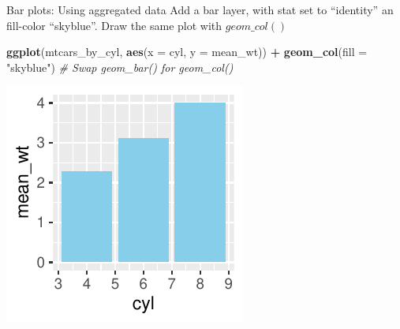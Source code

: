 \documentclass[
  ignorenonframetext,
]{beamer}
\newenvironment{Shaded}{\begin{snugshade}}{\end{snugshade}}
\newcommand{\AttributeTok}[1]{\textcolor[rgb]{0.13,0.29,0.53}{#1}}
\newcommand{\CommentTok}[1]{\textcolor[rgb]{0.56,0.35,0.01}{\textit{#1}}}
\newcommand{\FunctionTok}[1]{\textcolor[rgb]{0.13,0.29,0.53}{\textbf{#1}}}
\newcommand{\NormalTok}[1]{#1}
\newcommand{\SpecialCharTok}[1]{\textcolor[rgb]{0.81,0.36,0.00}{\textbf{#1}}}
\newcommand{\StringTok}[1]{\textcolor[rgb]{0.31,0.60,0.02}{#1}}
\begin{document}
\begin{frame}[fragile]{Bar plots: Using aggregated data}
\label{bar-plots-using-aggregated-data-6}
Add a bar layer, with stat set to ``identity'' an fill-color
``skyblue''. Draw the same plot with \(geom\_col()\)


\begin{Shaded}
\begin{Highlighting}[]
\FunctionTok{ggplot}\NormalTok{(mtcars\_by\_cyl, }\FunctionTok{aes}\NormalTok{(}\AttributeTok{x =}\NormalTok{ cyl, }\AttributeTok{y =}\NormalTok{ mean\_wt)) }\SpecialCharTok{+} \FunctionTok{geom\_col}\NormalTok{(}\AttributeTok{fill =} \StringTok{"skyblue"}\NormalTok{)  }\CommentTok{\# Swap geom\_bar() for geom\_col()}
\end{Highlighting}
\end{Shaded}

\begin{center}\includegraphics[width=0.5\linewidth]{Figs/unnamed-chunk-110-1} \end{center}
\end{frame}
\end{document}
